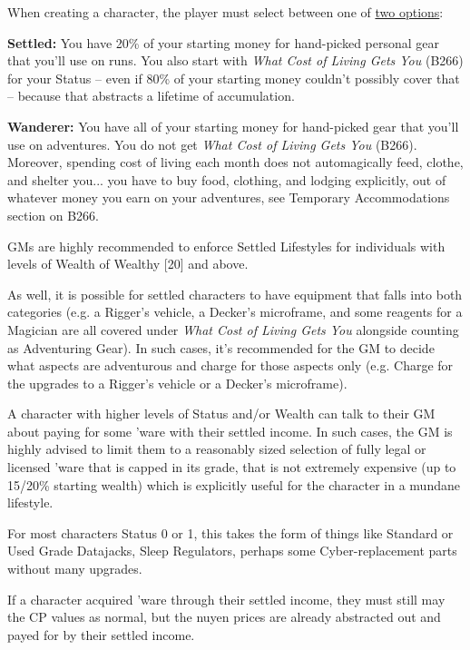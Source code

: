 \begin{multicols*}{2}
	When creating a character, the player must select between one of \textcolor{Blue}{\href{http://forums.sjgames.com/showpost.php?p=1792209&postcount=7}{two options}}:
	
	\textbf{Settled:} You have 20\% of your starting money for hand-picked personal gear that you'll use on runs. You also start with \textit{What Cost of Living Gets You} (B266) for your Status – even if 80\% of your starting money couldn't possibly cover that – because that abstracts a lifetime of accumulation.
	
	\textbf{Wanderer:} You have all of your starting money for hand-picked gear that you'll use on adventures. You do not get \textit{What Cost of Living Gets You} (B266). Moreover, spending cost of living each month does not automagically feed, clothe, and shelter you... you have to buy food, clothing, and lodging explicitly, out of whatever money you earn on your adventures, see Temporary Accommodations section on B266.
	
	GMs are highly recommended to enforce Settled Lifestyles for individuals with levels of Wealth of Wealthy [20] and above. 
	
	As well, it is possible for settled characters to have equipment that falls into both categories (e.g. a Rigger's vehicle, a Decker's microframe, and some reagents for a Magician are all covered under \textit{What Cost of Living Gets You} alongside counting as Adventuring Gear). In such cases, it's recommended for the GM to decide what aspects are adventurous and charge for those aspects only (e.g. Charge for the upgrades to a Rigger's vehicle or a Decker's microframe).
	
	A character with higher levels of Status and/or Wealth can talk to their GM about paying for some 'ware with their settled income. In such cases, the GM is highly advised to limit them to a reasonably sized selection of fully legal or licensed 'ware that is capped in its grade, that is not extremely expensive (up to 15/20\% starting wealth) which is explicitly useful for the character in a mundane lifestyle. 
	
	For most characters Status 0 or 1, this takes the form of things like Standard or Used Grade Datajacks, Sleep Regulators, perhaps some Cyber-replacement parts without many upgrades.
	
	If a character acquired 'ware through their settled income, they must still may the CP values as normal, but the nuyen prices are already abstracted out and payed for by their settled income.
	

\end{multicols*}
